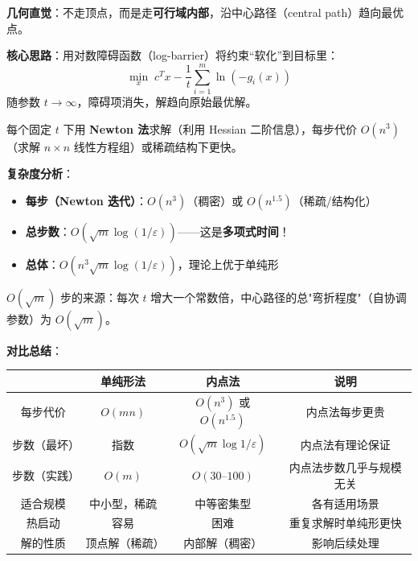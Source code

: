 \documentclass[12pt, a4paper]{ctexart}
\begin{document}
\begin{blackboard}

\textbf{几何直觉}：不走顶点，而是走\textbf{可行域内部}，沿中心路径（central path）趋向最优点。

\begin{center}
\end{center}

\textbf{核心思路}：用对数障碍函数（log-barrier）将约束``软化''到目标里：
\[
\min_x \; c^T x - \frac{1}{t} \sum_{i=1}^m \ln(-g_i(x))
\]
随参数 $t \to \infty$，障碍项消失，解趋向原始最优解。

每个固定 $t$ 下用 \textbf{Newton 法}求解（利用 Hessian 二阶信息），每步代价 $O(n^3)$（求解 $n\times n$ 线性方程组）或稀疏结构下更快。

\textbf{复杂度分析}：

\begin{itemize}
    \item \textbf{每步（Newton 迭代）}：$O(n^3)$（稠密）或 $O(n^{1.5})$（稀疏/结构化）
    \item \textbf{总步数}：$O(\sqrt{m} \log(1/\varepsilon))$——这是\textbf{多项式时间}！
    \item \textbf{总体}：$O(n^3 \sqrt{m} \log(1/\varepsilon))$，理论上优于单纯形
\end{itemize}

$O(\sqrt{m})$ 步的来源：每次 $t$ 增大一个常数倍，中心路径的总"弯折程度"（自协调参数）为 $O(\sqrt{m})$。

\textbf{对比总结}：

\begin{center}
\begin{tabular}{c|c|c|c}
 & 单纯形法 & 内点法 & 说明 \\
\hline
每步代价 & $O(mn)$ & $O(n^3)$ 或 $O(n^{1.5})$ & 内点法每步更贵 \\
步数（最坏） & 指数 & $O(\sqrt{m}\log 1/\varepsilon)$ & 内点法有理论保证 \\
步数（实践） & $O(m)$ & $O(30\text{--}100)$ & 内点法步数几乎与规模无关 \\
适合规模 & 中小型，稀疏 & 中等密集型 & 各有适用场景 \\
热启动 & 容易 & 困难 & 重复求解时单纯形更快 \\
解的性质 & 顶点解（稀疏） & 内部解（稠密） & 影响后续处理 \\
\end{tabular}
\end{center}

\end{blackboard}
\end{document}
